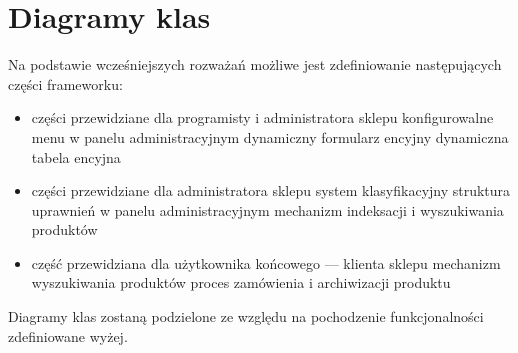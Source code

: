 \section{Diagramy klas}

Na podstawie wcześniejszych rozważań możliwe jest zdefiniowanie następujących części frameworku: 
\begin{itemize}
	\item części przewidziane dla programisty i administratora sklepu
	\subitem konfigurowalne menu w panelu administracyjnym
	\subitem dynamiczny formularz encyjny
	\subitem dynamiczna tabela encyjna
	\item części przewidziane dla administratora sklepu
	\subitem system klasyfikacyjny
	\subitem struktura uprawnień w panelu administracyjnym
	\subitem mechanizm indeksacji i wyszukiwania produktów
	\item część przewidziana dla użytkownika końcowego — klienta sklepu
	\subitem mechanizm wyszukiwania produktów
	\subitem proces zamówienia i archiwizacji produktu
\end{itemize}
Diagramy klas zostaną podzielone ze względu na pochodzenie funkcjonalności zdefiniowane wyżej. 


